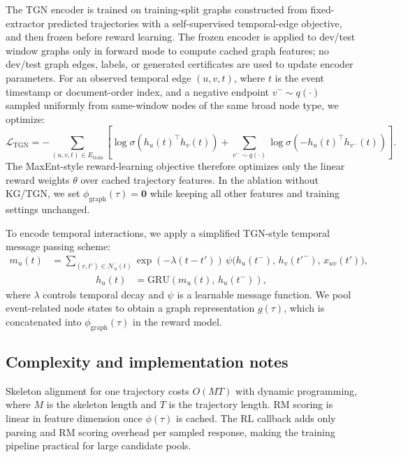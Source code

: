 \documentclass{article}
\begin{document}
The TGN encoder is trained on training-split graphs constructed from fixed-extractor predicted trajectories with a self-supervised temporal-edge objective, and then frozen before reward learning.
The frozen encoder is applied to dev/test window graphs only in forward mode to compute cached graph features; no dev/test graph edges, labels, or generated certificates are used to update encoder parameters.
For an observed temporal edge $(u,v,t)$, where $t$ is the event timestamp or document-order index, and a negative endpoint $v^-\sim q(\cdot)$ sampled uniformly from same-window nodes of the same broad node type, we optimize:
\begin{equation}
\mathcal{L}_{\mathrm{TGN}}
=
-\sum_{(u,v,t)\in E_{\mathrm{train}}}
\left[
\log \sigma(h_u(t)^\top h_v(t))
+
\sum_{v^-\sim q(\cdot)}
\log \sigma(-h_u(t)^\top h_{v^-}(t))
\right].
\end{equation}
The MaxEnt-style reward-learning objective therefore optimizes only the linear reward weights $\theta$ over cached trajectory features.
In the ablation without KG/TGN, we set $\phi_{\mathrm{graph}}(\tau)=\mathbf{0}$ while keeping all other features and training settings unchanged.

To encode temporal interactions, we apply a simplified TGN-style temporal message passing scheme:
\begin{equation}
\begin{aligned}
m_{u}(t) &=
\sum_{(v,t')\in \mathcal{N}_u(t)}
\exp\!\left(-\lambda (t-t')\right)\,
\psi\!\Big(
h_u(t^-),\, h_v(t'^-),\, x_{uv}(t')
\Big),
\end{aligned}
\end{equation}
\begin{equation}
\begin{aligned}
h_u(t) &= \mathrm{GRU}\!\left(m_u(t),\, h_u(t^-)\right),
\end{aligned}
\end{equation}
where $\lambda$ controls temporal decay and $\psi$ is a learnable message function.
We pool event-related node states to obtain a graph representation $g(\tau)$, which is concatenated into $\phi_{\text{graph}}(\tau)$ in the reward model.

\subsection{Complexity and implementation notes}
\label{sec:app_complexity}

Skeleton alignment for one trajectory costs $O(MT)$ with dynamic programming, where $M$ is the skeleton length and $T$ is the trajectory length.
RM scoring is linear in feature dimension once $\phi(\tau)$ is cached.
The RL callback adds only parsing and RM scoring overhead per sampled response, making the training pipeline practical for large candidate pools.
\end{document}
